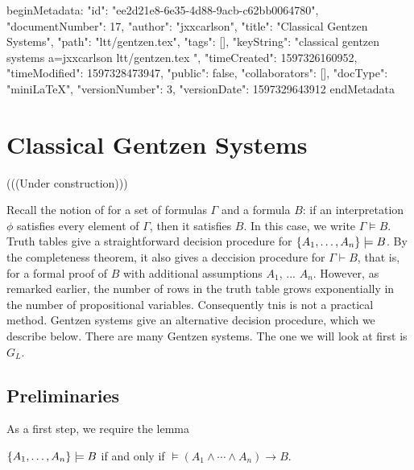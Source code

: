 beginMetadata:
{
    "id": "ee2d21e8-6e35-4d88-9acb-c62bb0064780",
    "documentNumber": 17,
    "author": "jxxcarlson",
    "title": "Classical Gentzen Systems",
    "path": "ltt/gentzen.tex",
    "tags": [],
    "keyString": "classical gentzen systems a=jxxcarlson ltt/gentzen.tex ",
    "timeCreated": 1597326160952,
    "timeModified": 1597328473947,
    "public": false,
    "collaborators": [],
    "docType": "miniLaTeX",
    "versionNumber": 3,
    "versionDate": 1597329643912
}
endMetadata


\begin{mathmacro}
\newcommand{\set}[1]{\{ #1 \}}
\end{mathmacro}


\section{Classical Gentzen Systems}

(((Under construction)))

\innertableofcontents

Recall the notion of  for a set of formulas $\Gamma$ and a formula $B$: if an interpretation $\phi$ satisfies every element of $\Gamma$, then it satisfies $B$.  In this case, we write $\Gamma \models B$.  Truth tables give a straightforward decision procedure for $\set{A_1, \ldots, A_n} \models B$. By the completeness theorem, it also gives a deccision procedure for $\Gamma \vdash B$, that is, for a formal proof of $B$ with additional assumptions $A_1$, ... $A_n$. However, as remarked earlier, the number of rows in the truth table grows exponentially in the number of propositional variables.  Consequently tnis is not a practical method.  Gentzen systems give an alternative decision procedure, which we describe below.  There are many Gentzen systems.  The one we will look at first is $G_L$.




\subsection{Preliminaries}

As a first step, we require the lemma

\begin{lemma}
$\set{A_1, \ldots, A_n} \models B$ if and only if $\models (A_1 \land \cdots \land A_n) \to B$.
\end{lemma}

